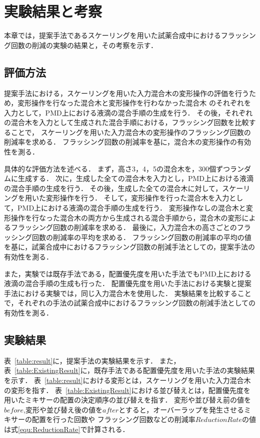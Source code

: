 \chapter{実験結果と考察}
本章では，提案手法であるスケーリングを用いた試薬合成中におけるフラッシング回数の削減の実験の結果と，その考察を示す．

\section{評価方法}
提案手法における，スケーリングを用いた入力混合木の変形操作の評価を行うため，変形操作を行なった混合木と変形操作を行わなかった混合木
のそれぞれを入力として，PMD上における液滴の混合手順の生成を行う．
その後，それぞれの混合木を入力として生成された混合手順における，フラッシング回数を比較することで，
スケーリングを用いた入力混合木の変形操作のフラッシング回数の削減率を求める．
フラッシング回数の削減率を基に，混合木の変形操作の有効性を測る．

具体的な評価方法を述べる．
まず，高さ3，4，5の混合木を，300個ずつランダムに生成する．
次に，生成した全ての混合木を入力とし，PMD上における液滴の混合手順の生成を行う．
その後，生成した全ての混合木に対して，スケーリングを用いた変形操作を行う．
そして，変形操作を行った混合木を入力として，PMD上における液滴の混合手順の生成を行う．
変形操作なしの混合木と変形操作を行なった混合木の両方から生成される混合手順から，混合木の変形によるフラッシング回数の削減率を求める．
最後に，入力混合木の高さごとのフラッシング回数の削減率の平均を求める．
フラッシング回数の削減率の平均の値を基に，試薬合成中におけるフラッシング回数の削減手法としての，提案手法の有効性を測る．

また，実験では既存手法である，配置優先度を用いた手法でもPMD上における液滴の混合手順の生成も行った．
配置優先度を用いた手法における実験と提案手法における実験では，同じ入力混合木を使用した．
実験結果を比較することで，それぞれの手法の試薬合成中におけるフラッシング回数の削減手法としての有効性を測る．

\section{実験結果}
表~\ref{table:result}に，提案手法の実験結果を示す．
また，表~\ref{table:ExistingResult}に，既存手法である配置優先度を用いた手法の実験結果を示す．
表~\ref{table:result}における変形とは，スケーリングを用いた入力混合木の変形を指す．
表~\ref{table:ExistingResult}における並び替えとは，配置優先度を用いたミキサーの配置の決定順序の並び替えを指す．
変形や並び替え前の値を$before$,変形や並び替え後の値を$after$とすると，オーバーラップを発生させるミキサーの配置を行った回数や
フラッシング回数などの削減率$ReductionRate$の値は式\ref{equ:ReductionRate}で計算される．


